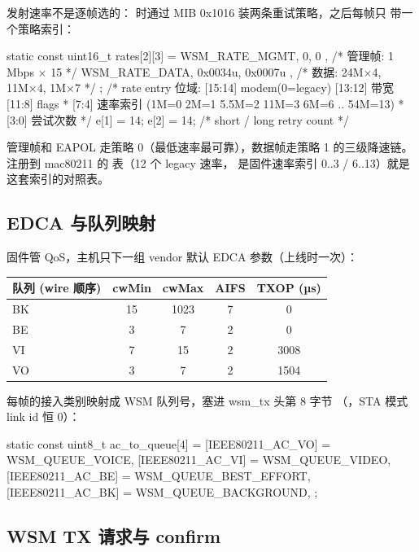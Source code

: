 发射速率不是逐帧选的： 时通过 MIB 0x1016 装两条重试策略，之后每帧只
带一个策略索引：

\begin{ccode}
static const uint16_t rates[2][3] = {
    { WSM_RATE_MGMT, 0, 0 },               /* 管理帧: 1 Mbps × 15 */
    { WSM_RATE_DATA, 0x0034u, 0x0007u },   /* 数据: 24M×4, 11M×4, 1M×7 */
};
/* rate entry 位域: [15:14] modem(0=legacy) [13:12] 带宽 [11:8] flags
 *                  [7:4] 速率索引 (1M=0 2M=1 5.5M=2 11M=3 6M=6 .. 54M=13)
 *                  [3:0] 尝试次数 */
e[1] = 14;  e[2] = 14;   /* short / long retry count */
\end{ccode}

管理帧和 EAPOL 走策略 0（最低速率最可靠），数据帧走策略 1 的三级降速链。
注册到 mac80211 的  表（12 个 legacy 速率，
是固件速率索引 0..3 / 6..13）就是这套索引的对照表。

\subsection{EDCA 与队列映射}

固件管 QoS，主机只下一组 vendor 默认 EDCA 参数（上线时一次）：

\begin{table}[H]
\centering
\begin{tabular}{lcccc}
\toprule
队列 (wire 顺序) & cwMin & cwMax & AIFS & TXOP (µs) \\
\midrule
BK & 15 & 1023 & 7 & 0 \\
BE & 3 & 7 & 2 & 0 \\
VI & 7 & 15 & 2 & 3008 \\
VO & 3 & 7 & 2 & 1504 \\
\bottomrule
\end{tabular}
\end{table}

每帧的接入类别映射成 WSM 队列号，塞进 wsm\_tx 头第 8 字节
（，STA 模式 link id 恒 0）：

\begin{ccode}
static const uint8_t ac_to_queue[4] = {
    [IEEE80211_AC_VO] = WSM_QUEUE_VOICE,
    [IEEE80211_AC_VI] = WSM_QUEUE_VIDEO,
    [IEEE80211_AC_BE] = WSM_QUEUE_BEST_EFFORT,
    [IEEE80211_AC_BK] = WSM_QUEUE_BACKGROUND,
};
\end{ccode}

\subsection{WSM TX 请求与 confirm}


